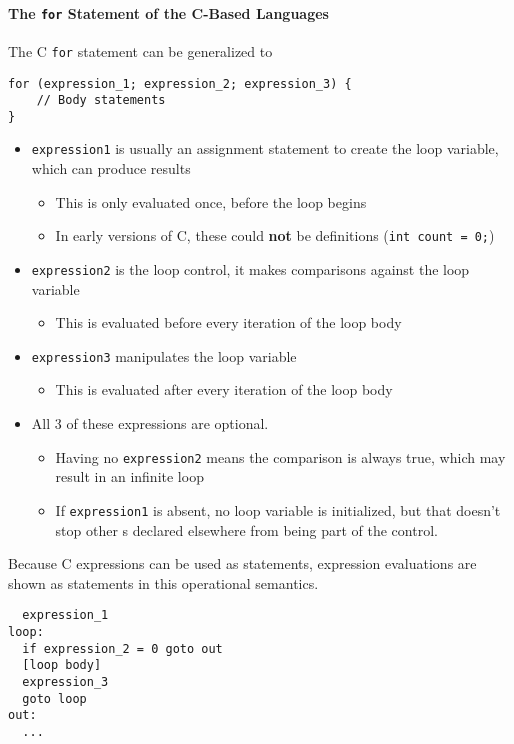 \paragraph{The \texttt{for} Statement of the C-Based Languages}\label{par:Counter_Controlled_Loops-C_Langs}
The C \texttt{for} statement can be generalized to
\begin{verbatim}
for (expression_1; expression_2; expression_3) {
    // Body statements
}
\end{verbatim}
\begin{itemize}[noitemsep]
\item \texttt{expression\textunderscore{}1} is usually an assignment statement to create the loop variable, which can produce results
  \begin{itemize}[noitemsep]
  \item This is only evaluated once, before the loop begins
  \item In early versions of C, these could \textbf{not} be definitions (\texttt{int count = 0;})
  \end{itemize}
\item \texttt{expression\textunderscore{}2} is the loop control, it makes comparisons against the loop variable
  \begin{itemize}[noitemsep]
  \item This is evaluated before every iteration of the loop body
  \end{itemize}
\item \texttt{expression\textunderscore{}3} manipulates the loop variable
  \begin{itemize}[noitemsep]
  \item This is evaluated after every iteration of the loop body
  \end{itemize}
\item All 3 of these expressions are optional.
  \begin{itemize}[noitemsep]
  \item Having no \texttt{expression\textunderscore{}2} means the comparison is always true, which may result in an infinite loop
  \item If \texttt{expression\textunderscore{}1} is absent, no loop variable is initialized, but that doesn't stop other s declared elsewhere from being part of the control.
  \end{itemize}
\end{itemize}

Because C expressions can be used as statements, expression evaluations are shown as statements in this operational semantics.
\begin{verbatim}
  expression_1
loop:
  if expression_2 = 0 goto out
  [loop body]
  expression_3
  goto loop
out:
  ...
\end{verbatim}

